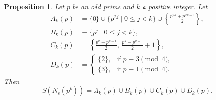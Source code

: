 \documentclass[10pt,leqno]{amsart}
\newtheorem{proposition}[theorem]{Proposition}
\theoremstyle{definition}
\theoremstyle{remark}
\numberwithin{theorem}{section}
\begin{document}
\begin{proposition}
    Let $p$ be an odd prime and $k$ a positive integer. Let 
$$
\begin{aligned}
A_k(p)&=\{0\}\cup \{p^{2j} \mid 0\le j<k\}\cup\left\{\frac{p^{2k}+p^{2k-1}}{2}\right\},\\
B_k(p)&=\{p^{j} \mid 0\le j<k\},\\
C_k(p)&=\left\{\frac{p^{k}+p^{k-1}}{2},\ \frac{p^{k}-p^{k-1}}{2}+1\right\},\\
D_k(p)&=\begin{cases}
\{2\}, & \text{if } p\equiv 3\pmod{4},\\[4pt]
\{3\}, & \text{if } p\equiv 1\pmod{4}.
\end{cases}
\end{aligned}
$$
  Then $$S(N_{\mathrm s}(p^k))=A_k(p)\cup B_k(p)\cup C_k(p) \cup D_k(p).$$
\end{proposition}
\end{document}
